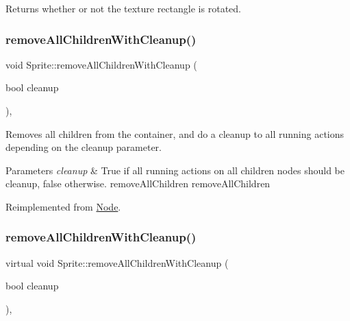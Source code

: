 Returns whether or not the texture rectangle is rotated. \mbox{\label{classSprite_a10eb2d2ae7c326487850cd1fec42382c}} 
\subsubsection{\texorpdfstring{remove\+All\+Children\+With\+Cleanup()}{removeAllChildrenWithCleanup()}\hspace{0.1cm}{\footnotesize\ttfamily [1/2]}}
{\footnotesize\ttfamily void Sprite\+::remove\+All\+Children\+With\+Cleanup (\begin{DoxyParamCaption}\item[{bool}]{cleanup }\end{DoxyParamCaption})\hspace{0.3cm}{\ttfamily [override]}, {\ttfamily [virtual]}}

Removes all children from the container, and do a cleanup to all running actions depending on the cleanup parameter.


\begin{DoxyParams}{Parameters}
{\em cleanup} & True if all running actions on all children nodes should be cleanup, false otherwise.  remove\+All\+Children  remove\+All\+Children \\
\hline
\end{DoxyParams}


Reimplemented from \hyperlink{classNode_aca66e2b385c3dbf1a6f55627c4a13192}{Node}.

\mbox{\label{classSprite_aaaf5e178d5fd88574b9803fe3fab94fa}} 
\subsubsection{\texorpdfstring{remove\+All\+Children\+With\+Cleanup()}{removeAllChildrenWithCleanup()}\hspace{0.1cm}{\footnotesize\ttfamily [2/2]}}
{\footnotesize\ttfamily virtual void Sprite\+::remove\+All\+Children\+With\+Cleanup (\begin{DoxyParamCaption}\item[{bool}]{cleanup }\end{DoxyParamCaption})\hspace{0.3cm}{\ttfamily [override]}, {\ttfamily [virtual]}}

